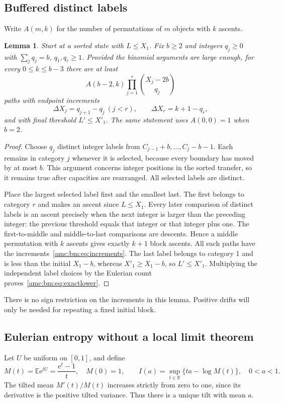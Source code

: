 \documentclass[11pt,letterpaper]{article}
\newtheorem{lemma}[theorem]{Lemma}
\theoremstyle{remark}\newtheorem{remark}[theorem]{Remark}
\newcommand{\ee}{\mathrm e}
\newcommand{\R}{\mathbb R}
\begin{document}
\subsection{Buffered distinct labels}
Write $A(m,k)$ for the number of permutations of $m$ objects with $k$ ascents.
\begin{lemma}\label{amc:bm:lem:lowerblock}
Start at a sorted state with $L\le X_1$. Fix $b\ge2$ and integers $q_j\ge0$ with $\sum_jq_j=b$, $q_1,q_r\ge1$. Provided the binomial arguments are large enough, for every $0\le k\le b-3$ there are at least
\begin{equation}\label{amc:bm:eq:exactlower}
 A(b-2,k)\prod_{j=1}^r\binom{X_j-2b}{q_j}
\end{equation}
paths with endpoint increments
\begin{equation}\label{amc:bm:eq:increments}
 \Delta X_j=q_{j+1}-q_j\ (j<r),\qquad
 \Delta X_r=k+1-q_r,
\end{equation}
and with final threshold $L'\le X'_1$. The same statement uses $A(0,0)=1$ when $b=2$.
\end{lemma}
\begin{proof}
Choose $q_j$ distinct integer labels from $C_{j-1}+b,\ldots,C_j-b-1$. Each remains in category $j$ whenever it is selected, because every boundary has moved by at most $b$. This argument concerns integer positions in the sorted transfer, so it remains true after capacities are rearranged. All selected labels are distinct.

Place the largest selected label first and the smallest last. The first belongs to category $r$ and makes an ascent since $L\le X_1$. Every later comparison of distinct labels is an ascent precisely when the next integer is larger than the preceding integer: the previous threshold equals that integer or that integer plus one. The first-to-middle and middle-to-last comparisons are descents. Hence a middle permutation with $k$ ascents gives exactly $k+1$ block ascents. All such paths have the increments~\eqref{amc:bm:eq:increments}. The last label belongs to category 1 and is less than the initial $X_1-b$, whereas $X'_1\ge X_1-b$, so $L'\le X'_1$. Multiplying the independent label choices by the Eulerian count proves~\eqref{amc:bm:eq:exactlower}.
\end{proof}
There is no sign restriction on the increments in this lemma. Positive drifts will only be needed for repeating a fixed initial block.

\subsection{Eulerian entropy without a local limit theorem}
Let $U$ be uniform on $[0,1]$, and define
\[
 M(t)=\mathbb E\ee^{tU}=\frac{\ee^t-1}{t},\quad M(0)=1,
 \qquad I(a)=\sup_{t\in\R}\{ta-\log M(t)\},\quad 0<a<1.
\]
The tilted mean $M'(t)/M(t)$ increases strictly from zero to one, since its derivative is the positive tilted variance. Thus there is a unique tilt with mean $a$.
\end{document}

